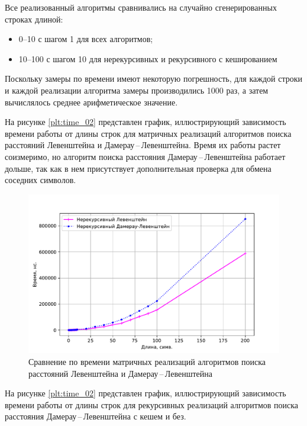 Все реализованный алгоритмы сравнивались на случайно сгенерированных строках длиной:
\begin{itemize}
	\item 0--10 с шагом 1 для всех алгоритмов;
	\item 10--100 с шагом 10 для нерекурсивных и рекурсивного с кешированием 
\end{itemize}
Поскольку замеры по времени имеют некоторую погрешность, для каждой строки и каждой реализации алгоритма замеры производились 1000 раз, а затем вычислялось среднее арифметическое значение.

На рисунке \ref{plt:time_02} представлен график, иллюстрирующий зависимость времени работы от длины строк для матричных реализаций алгоритмов поиска расстояний Левенштейна и Дамерау\,--\,Левенштейна. Время их работы растет соизмеримо, но алгоритм поиска расстояния Дамерау\,--\,Левенштейна работает дольше, так как в нем присутствует дополнительная проверка для обмена соседних символов.
\begin{figure}[h]
	\centering
	\includegraphics[height=0.4\textheight, page=1]{img/figures.pdf}
	\caption{Сравнение по времени матричных реализаций алгоритмов поиска расстояний Левенштейна и Дамерау\,--\,Левенштейна}
	\label{plt:time_01}
\end{figure}

На рисунке \ref{plt:time_02} представлен график, иллюстрирующий зависимость времени работы от длины строк для рекурсивных реализаций алгоритмов поиска расстояния Дамерау\,--\,Левенштейна с кешем и без.


